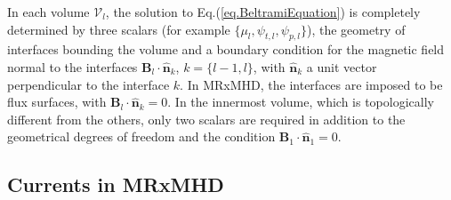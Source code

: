 \documentclass[my_thesis.tex]{subfiles}
\begin{document}
In each volume $\mathcal{V}_l$, the solution to Eq.(\ref{eq.BeltramiEquation}) is completely determined by three scalars (for example $\{\mu_l,\psi_{t,l},\psi_{p,l}\}$), the geometry of interfaces bounding the volume and a boundary condition for the magnetic field normal to the interfaces $\mathbf{B}_l\cdot\hat{\mathbf{n}}_k$, $k=\{l-1,l\}$, with $\hat{\mathbf{n}}_k$ a unit vector perpendicular to the interface $k$. In \ac{MRxMHD}, the interfaces are imposed to be flux surfaces, with $\mathbf{B}_l\cdot\hat{\mathbf{n}}_k=0$. In the innermost volume, which is topologically different from the others, only two scalars are required in addition to the geometrical degrees of freedom and the condition $\mathbf{B}_1\cdot\hat{\mathbf{n}}_1=0$.



\subsection{Currents in MRxMHD}
\end{document}
